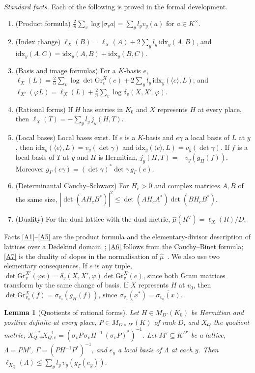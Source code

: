 \documentclass[11pt]{amsart}
\theoremstyle{plain}
\newtheorem{lemma}[theorem]{Lemma}
\theoremstyle{definition}
\numberwithin{equation}{section}
\begin{document}
\emph{Standard facts.} Each of the following is proved in the formal development.
\begin{enumerate}[label=\textup{(A\arabic*)}, leftmargin=3.2em]
\item\label{A1} (Product formula) $\frac2n\sum_v\log|\sigma_va|=\sum_yl_yv_y(a)$ for $a\in K^\times$.
\item\label{A2} (Index change) $\ell_X(B)=\ell_X(A)+2\sum_yl_y\,\mathrm{idx}_y(A,B)$, and
  $\mathrm{idx}_y(A,C)=\mathrm{idx}_y(A,B)+\mathrm{idx}_y(B,C)$.
\item\label{A3} (Basis and image formulas) For a $K$-basis $e$,
  $\ell_X(L)=\frac2n\sum_v\log\det\mathrm{Gr}^X_v(e)+2\sum_yl_y\,\mathrm{idx}_y(\langle e\rangle,L)$; and
  $\ell_{X'}(\varphi L)=\ell_X(L)+\frac2n\sum_v\log\delta_v(X,X',\varphi)$.
\item\label{A4} (Rational forms) If $H$ has entries in $K_0$ and $X$ represents $H$ at every place,
  then $\ell_X(T)=-\sum_yl_y\,j_y(H,T)$.
\item\label{A5} (Local bases) Local bases exist. If $e$ is a $K$-basis and $e\gamma$ a local basis of
  $L$ at $y$, then $\mathrm{idx}_y(\langle e\rangle,L)=v_y(\det\gamma)$ and
  $\mathrm{idx}_{\bar y}(\langle e\rangle,L)=v_{\bar y}(\det\gamma)$. If $f$ is a local basis of $T$ at $y$ and
  $H$ is Hermitian, $j_y(H,T)=-v_y(g_H(f))$. Moreover $g_\Gamma(e\gamma)=(\det\gamma)^\ast\det\gamma\,g_\Gamma(e)$.
\item\label{A6} (Determinantal Cauchy--Schwarz) For $H_c>0$ and complex matrices $A,B$ of the same
  size, $|\det(AH_cB^\ast)|^2\le\det(AH_cA^\ast)\det(BH_cB^\ast)$.
\item\label{A7} (Duality) For the dual lattice with the dual metric, $\hat\mu(R^\vee)=\ell_X(R)/D$.
\end{enumerate}
Facts \ref{A1}--\ref{A5} are the product formula and the elementary-divisor description of lattices
over a Dedekind domain~\cite{neukirch}; \ref{A6} follows from the Cauchy--Binet formula; \ref{A7} is
the duality of slopes in the normalisation of $\hat\mu$~\cite{bost-bourbaki,gaudron}. We also use two
elementary consequences. If $e$ is any tuple, $\det\mathrm{Gr}^{X'}_v(\varphi e)=\delta_v(X,X',\varphi)
\det\mathrm{Gr}^X_v(e)$, since both Gram matrices transform by the same change of basis. If $X$ represents
$H$ at $v_0$, then $\det\mathrm{Gr}^X_{v_0}(f)=\sigma_{v_0}(g_H(f))$, since
$\sigma_{v_0}(x^\ast)=\overline{\sigma_{v_0}(x)}$.

\begin{lemma}[Quotients of rational forms]\label{lem:quotgram}
Let $H\in M_{D'}(K_0)$ be Hermitian and positive definite at every place, $P\in M_{D\times D'}(K)$
of rank $D$, and $X_Q$ the quotient metric, $X_{Q,v}^{-\ast}X_{Q,v}^{-1}=(\sigma_vP\,\sigma_vH^{-1}\,(\sigma_vP)^\ast)^{-1}$.
Let $M'\subseteq K^{D'}$ be a lattice, $\Lambda=PM'$, $\Gamma=(PH^{-1}P^\ast)^{-1}$, and $e_y$ a local basis of
$\Lambda$ at each $y$. Then $\ell_{X_Q}(\Lambda)\le\sum_yl_y\,v_y(g_\Gamma(e_y))$.
\end{lemma}
\end{document}
